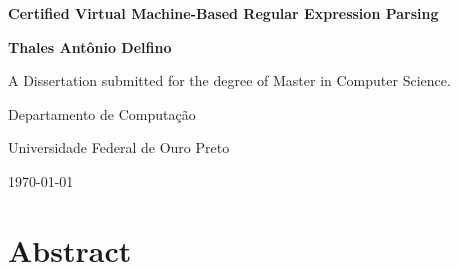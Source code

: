 \documentclass[oneside,12pt]{scrbook}
\theoremstyle{definition}
\theoremstyle{plain}
\theoremstyle{definition}
\begin{document}
\begin{titlepage}
\centering
\vspace*{1in}
\begin{Large}\bfseries
Certified Virtual Machine-Based Regular Expression Parsing \par
\end{Large}
\vspace{1.5in}
\begin{large}\bfseries
Thales Antônio Delfino\par
\end{large}
\vfill
A Dissertation submitted for the degree of Master in Computer Science.
\par
\vspace{0.5in}
Departamento de Computação
\par
Universidade Federal de Ouro Preto
\par
\vspace{0.5in}
\today 
\par
\end{titlepage}


\frontmatter
\tableofcontents





\chapter{Abstract}\label{chapter:abstract}

\end{document}
